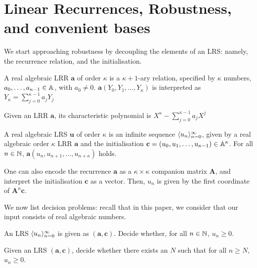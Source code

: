 \section{Linear Recurrences, Robustness, and convenient bases}
\label{section:solspace}

We start approaching robustness by decoupling the elements of an LRS: namely, the recurrence relation, and the initialisation.

\begin{definition}
\label{def:LRR}
A real algebraic LRR $\mathbf{a}$ of order $\kappa$ is a $\kappa+1$-ary relation, specified by $\kappa$ numbers, $a_0, \dots, a_{\kappa-1} \in \mathbb{A}$, with $a_0 \ne 0$. $\mathbf{a}(Y_0, Y_1, \dots, Y_\kappa)$ is interpreted as 
$
Y_\kappa = \sum_{j=0}^{\kappa-1} a_j Y_j
$
\end{definition}

\begin{definition}
\label{def:charpoly}
Given an LRR $\mathbf{a}$, its characteristic polynomial is
$
X^{\kappa} - \sum_{j=0}^{\kappa-1}a_j X^j
$
\end{definition}

\begin{definition}
\label{def:LRS}
A real algebraic LRS $\mathbf{u}$ of order $\kappa$ is an infinite sequence $\langle u_n\rangle_{n=0}^\infty$, given by a real algebraic order $\kappa$ LRR $\mathbf{a}$ and the initialisation $\mathbf{c} = (u_0, u_1, \dots, u_{\kappa-1}) \in \mathbb{A}^\kappa$. For all $n \in \mathbb{N}$, $\mathbf{a}(u_n, u_{n+1}, \dots, u_{n+\kappa})$ holds.
\end{definition}

One can also encode the recurrence $\mathbf{a}$ as a $\kappa \times \kappa$ companion matrix $\mathbf{A}$, and interpret the initialisation $\mathbf{c}$ as a vector. Then, $u_n$ is given by the first coordinate of $\mathbf{A}^n\mathbf{c}$.

We now list decision problems: recall that in this paper, we consider that our input consists of real algebraic numbers.

\begin{problem}[Positivity]
\label{prob:pos}
An LRS $\langle u_n\rangle_{n=0}^\infty$ is given as $(\mathbf{a}, \mathbf{c})$. Decide whether, for all $n \in \mathbb{N}$, $u_n \ge 0$.
\end{problem}

\begin{problem}
\label{prob:ultpos}
Given an LRS $(\mathbf{a}, \mathbf{c})$, decide whether there exists an $N$ such that for all $n \ge N$, $u_n \ge 0$.
\end{problem}

